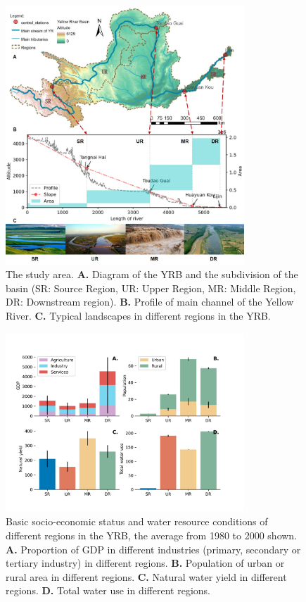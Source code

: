 \documentclass[9pt,twoside,lineno]{pnas-new}
\begin{document}
\begin{figure}
    \centering
    \includegraphics[width=0.8\textwidth]{../../figures/sup/s1_study_area.jpg}
    \caption{
        The study area.
        \textbf{A.} Diagram of the YRB and the subdivision of the basin (SR: Source Region, UR: Upper Region, MR: Middle Region, DR: Downstream region).
        \textbf{B.} Profile of main channel of the Yellow River.
        \textbf{C.} Typical landscapes in different regions in the YRB.
    }
\end{figure}

\begin{figure}
    \centering
    \includegraphics[width=0.8\textwidth]{../../figures/sup/region_differences.jpg}
    \caption{
        Basic socio-economic status and water resource conditions of different regions in the YRB, the average from 1980 to 2000 shown.
        \textbf{A.} Proportion of GDP in different industries (primary, secondary or tertiary industry) in different regions.
        \textbf{B.} Population of urban or rural area in different regions.
        \textbf{C.} Natural water yield in different regions.
        \textbf{D.} Total water use in different regions.
    }
\end{figure}
\end{document}
